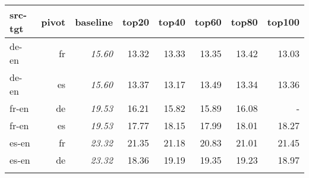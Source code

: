 \begin{tabular}{lrrrrrrr}
\toprule

src-tgt & pivot & baseline & top20 & top40 & top60 & top80 & top100 \\
\toprule

de-en & fr & \emph{15.60} & 13.32 & 13.33 & 13.35 & 13.42 & 13.03 \\
de-en & es & \emph{15.60} & 13.37 & 13.17 & 13.49 & 13.34 & 13.36 \\
fr-en & de & \emph{19.53} & 16.21 & 15.82 & 15.89 & 16.08 & - \\
fr-en & es & \emph{19.53} & 17.77 & 18.15 & 17.99 & 18.01 & 18.27 \\
es-en & fr & \emph{23.32} & 21.35 & 21.18 & 20.83 & 21.01 & 21.45\\
es-en & de & \emph{23.32} & 18.36 & 19.19 & 19.35 & 19.23 & 18.97 \\
\bottomrule
\centering 
\small
\label{table:eparltopn}
\end{tabular}
